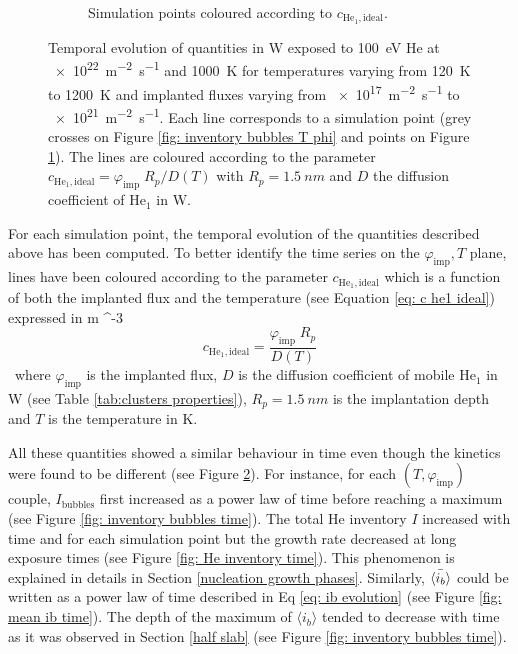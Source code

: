 \begin{figure} [ht!]
\begin{subfigure}{0.5\linewidth}
        \caption{Simulation points coloured according to $c_{\mathrm{He}_1, \mathrm{ideal}}$.}
        \label{fig: simulations points with parameter}
    \end{subfigure}
    \caption{Temporal evolution of quantities in W exposed to \SI{100}{eV} He at \SI{e22}{m^{-2}.s^{-1}} and \SI{1000}{K} for temperatures varying from \SI{120}{K} to \SI{1200}{K} and implanted fluxes varying from \SI{e17}{m^{-2}s^{-1}} to \SI{e21}{m^{-2}s^{-1}}. Each line corresponds to a simulation point (grey crosses on Figure \ref{fig: inventory bubbles T phi} and points on Figure \ref{fig: simulations points with parameter}). The lines are coloured according to the parameter $c_{\mathrm{He}_1, \mathrm{ideal}} = \varphi_\mathrm{imp} \; R_p/D(T)$ with $R_p = \SI{1.5}{nm}$ and $D$ the diffusion coefficient of $\mathrm{He}_1$ in W.}
    \label{fig:quantities time}
\end{figure}

For each simulation point, the temporal evolution of the quantities described above has been computed.
To better identify the time series on the $\varphi_\mathrm{imp}, T$ plane, lines have been coloured according to the parameter $c_{\mathrm{He}_1, \mathrm{ideal}}$ which is a function of both the implanted flux and the temperature (see Equation \ref{eq: c he1 ideal}) expressed in \si{m ^{-3}}.

\begin{equation}
    c_{\mathrm{He}_1, \mathrm{ideal}} = \frac{\varphi_\mathrm{imp} \; R_p}{D(T)}
    \label{eq: c he1 ideal}
\end{equation}
where $\varphi_\mathrm{imp}$ is the implanted flux, $D$ is the diffusion coefficient of mobile $\mathrm{He}_1$ in W (see Table \ref{tab:clusters properties}), $R_p = \SI{1.5}{nm}$ is the implantation depth and $T$ is the temperature in \si{K}.

All these quantities showed a similar behaviour in time even though the kinetics were found to be different (see Figure \ref{fig:quantities time}).
For instance, for each $(T, \varphi_\mathrm{imp})$ couple, $I_\mathrm{bubbles}$ first increased as a power law of time before reaching a maximum (see Figure \ref{fig: inventory bubbles time}).
The total He inventory $I$ increased with time and for each simulation point but the growth rate decreased at long exposure times (see Figure \ref{fig: He inventory time}).
This phenomenon is explained in details in Section \ref{nucleation growth phases}.
Similarly, $\Bar{\langle i_b \rangle}$ could be written as a power law of time described in Eq \ref{eq: ib evolution} (see Figure \ref{fig: mean ib time}).
The depth of the maximum of $\langle i_b \rangle$ tended to decrease with time as it was observed in Section \ref{half slab} (see Figure \ref{fig: inventory bubbles time}).

